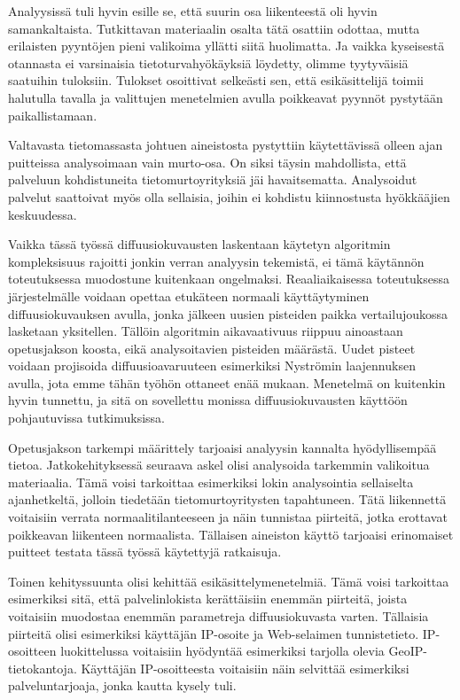 Analyysissä tuli hyvin esille se, että suurin osa liikenteestä oli
hyvin samankaltaista. Tutkittavan materiaalin osalta tätä osattiin
odottaa, mutta erilaisten pyyntöjen pieni valikoima yllätti siitä
huolimatta. Ja vaikka kyseisestä otannasta ei varsinaisia
tietoturvahyökäyksiä löydetty, olimme tyytyväisiä saatuihin
tuloksiin. Tulokset osoittivat selkeästi sen, että esikäsittelijä
toimii halutulla tavalla ja valittujen menetelmien avulla poikkeavat
pyynnöt pystytään paikallistamaan.

Valtavasta tietomassasta johtuen aineistosta pystyttiin käytettävissä
olleen ajan puitteissa analysoimaan vain murto-osa. On siksi täysin
mahdollista, että palveluun kohdistuneita tietomurtoyrityksiä jäi
havaitsematta. Analysoidut palvelut saattoivat myös olla sellaisia,
joihin ei kohdistu kiinnostusta hyökkääjien keskuudessa.

Vaikka tässä työssä diffuusiokuvausten laskentaan käytetyn algoritmin
kompleksisuus rajoitti jonkin verran analyysin tekemistä, ei tämä
käytännön toteutuksessa muodostune kuitenkaan
ongelmaksi. Reaaliaikaisessa toteutuksessa järjestelmälle voidaan
opettaa etukäteen normaali käyttäytyminen diffuusiokuvauksen avulla,
jonka jälkeen uusien pisteiden paikka vertailujoukossa lasketaan
yksitellen. Tällöin algoritmin aikavaativuus riippuu ainoastaan
opetusjakson koosta, eikä analysoitavien pisteiden määrästä. Uudet
pisteet voidaan projisoida diffuusioavaruuteen esimerkiksi Nyströmin
laajennuksen avulla, jota emme tähän työhön ottaneet enää
mukaan. Menetelmä on kuitenkin hyvin tunnettu, ja sitä on sovellettu
monissa diffuusiokuvausten käyttöön pohjautuvissa tutkimuksissa.


Opetusjakson tarkempi määrittely tarjoaisi analyysin kannalta
hyödyllisempää tietoa. Jatkokehityksessä seuraava askel olisi
analysoida tarkemmin valikoitua materiaalia. Tämä voisi tarkoittaa
esimerkiksi lokin analysointia sellaiselta ajanhetkeltä, jolloin tiedetään
tietomurtoyritysten tapahtuneen. Tätä liikennettä voitaisiin verrata
normaalitilanteeseen ja näin tunnistaa piirteitä, jotka erottavat
poikkeavan liikenteen normaalista.  Tällaisen aineiston käyttö
tarjoaisi erinomaiset puitteet testata tässä työssä käytettyjä
ratkaisuja.

Toinen kehityssuunta olisi kehittää esikäsittelymenetelmiä. Tämä voisi
tarkoittaa esimerkiksi sitä, että palvelinlokista kerättäisiin enemmän
piirteitä, joista voitaisiin muodostaa enemmän parametreja
diffuusiokuvasta varten. Tällaisia piirteitä olisi esimerkiksi
käyttäjän IP-osoite ja Web-selaimen tunnistetieto. IP-osoitteen
luokittelussa voitaisiin hyödyntää esimerkiksi tarjolla olevia
GeoIP-\-tietokantoja. Käyttäjän IP-osoitteesta voitaisiin näin
selvittää esimerkiksi palveluntarjoaja, jonka kautta kysely
tuli.

